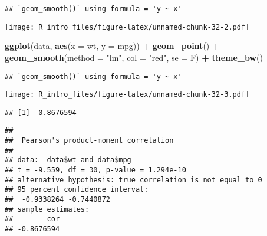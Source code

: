 \documentclass[
  a4paper,
]{article}
\newenvironment{Shaded}{\begin{snugshade}}{\end{snugshade}}
\newcommand{\AttributeTok}[1]{\textcolor[rgb]{0.13,0.29,0.53}{#1}}
\newcommand{\FunctionTok}[1]{\textcolor[rgb]{0.13,0.29,0.53}{\textbf{#1}}}
\newcommand{\NormalTok}[1]{#1}
\newcommand{\SpecialCharTok}[1]{\textcolor[rgb]{0.81,0.36,0.00}{\textbf{#1}}}
\newcommand{\StringTok}[1]{\textcolor[rgb]{0.31,0.60,0.02}{#1}}
\begin{document}
\begin{verbatim}
## `geom_smooth()` using formula = 'y ~ x'
\end{verbatim}

\texttt{[image: R\_intro\_files/figure-latex/unnamed-chunk-32-2.pdf]}

\begin{Shaded}
\begin{Highlighting}[]
\FunctionTok{ggplot}\NormalTok{(data, }\FunctionTok{aes}\NormalTok{(}\AttributeTok{x =}\NormalTok{ wt, }\AttributeTok{y =}\NormalTok{ mpg)) }\SpecialCharTok{+} \FunctionTok{geom\_point}\NormalTok{() }\SpecialCharTok{+} \FunctionTok{geom\_smooth}\NormalTok{(}\AttributeTok{method =} \StringTok{"lm"}\NormalTok{,}
    \AttributeTok{col =} \StringTok{"red"}\NormalTok{, }\AttributeTok{se =}\NormalTok{ F) }\SpecialCharTok{+} \FunctionTok{theme\_bw}\NormalTok{()}
\end{Highlighting}
\end{Shaded}

\begin{verbatim}
## `geom_smooth()` using formula = 'y ~ x'
\end{verbatim}

\texttt{[image: R\_intro\_files/figure-latex/unnamed-chunk-32-3.pdf]}

\begin{Shaded}
\end{Shaded}

\begin{verbatim}
## [1] -0.8676594
\end{verbatim}

\begin{Shaded}
\end{Shaded}

\begin{verbatim}
## 
##  Pearson's product-moment correlation
## 
## data:  data$wt and data$mpg
## t = -9.559, df = 30, p-value = 1.294e-10
## alternative hypothesis: true correlation is not equal to 0
## 95 percent confidence interval:
##  -0.9338264 -0.7440872
## sample estimates:
##        cor 
## -0.8676594
\end{verbatim}
\end{document}
